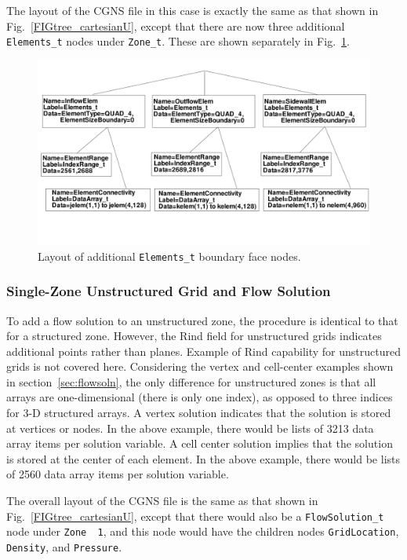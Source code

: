 \documentclass[12pt]{article}
\begin{document}
The layout of the CGNS file in this case is exactly the same as that shown
in Fig.~\ref{FIGtree_cartesianU}, except that there are now three additional
{\tt Elements\_t} nodes under {\tt Zone\_t}.  These are shown separately in 
Fig.~\ref{FIGtree_cartesianUelem}.

\begin{figure}[hpbt]
\centerline{{\includegraphics[width=150mm]{figures/tree_cartesianUelem}}}
\caption{Layout of additional {\tt Elements\_t} boundary face nodes.}
\label{FIGtree_cartesianUelem}
\end{figure}
%

\subsubsection{Single-Zone Unstructured Grid and Flow Solution} \label{sec:unstrflow}

To add a flow solution to an unstructured zone, the procedure is
identical to that for a structured zone.  However, the Rind field for unstructured
grids indicates additional points rather than planes. Example of Rind capability for unstructured
grids is not covered here.
Considering the vertex and cell-center examples shown in section~\ref{sec:flowsoln}, the
only difference for unstructured zones is that
all arrays are one-dimensional (there is only one index), as opposed to three 
indices for 3-D structured arrays.  A vertex solution indicates that the solution
is stored at vertices or nodes.  In the above example, 
there would be lists of 3213
data array items per solution variable.  A cell center solution implies that the solution
is stored at the center of each element.  In the above example, 
there would be lists of 2560 data array items per solution variable.

The overall layout of the CGNS file is the same as that shown in 
Fig.~\ref{FIGtree_cartesianU}, except that there would also be a
{\tt FlowSolution\_t} node under {\tt Zone~~1}, and this node would
have the children nodes {\tt GridLocation},
{\tt Density}, and {\tt Pressure}.
\end{document}
